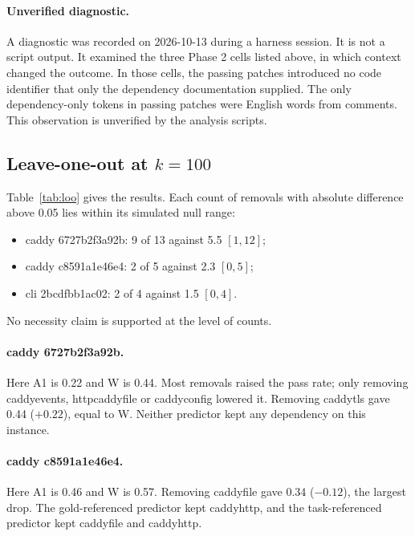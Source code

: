 \paragraph{Unverified diagnostic.} A diagnostic was recorded on 2026-10-13 during a harness session. It is not a script output. It examined the three Phase 2 cells listed above, in which context changed the outcome. In those cells, the passing patches introduced no code identifier that only the dependency documentation supplied. The only dependency-only tokens in passing patches were English words from comments. This observation is unverified by the analysis scripts.

\subsection{Leave-one-out at $k=100$}

Table~\ref{tab:loo} gives the results. Each count of removals with absolute difference above 0.05 lies within its simulated null range:
\begin{itemize}
\item caddy 6727b2f3a92b: 9 of 13 against 5.5 $[1, 12]$;
\item caddy c8591a1e46e4: 2 of 5 against 2.3 $[0, 5]$;
\item cli 2bcdfbb1ac02: 2 of 4 against 1.5 $[0, 4]$.
\end{itemize}
No necessity claim is supported at the level of counts.

\paragraph{caddy 6727b2f3a92b.} Here A1 is 0.22 and W is 0.44. Most removals raised the pass rate; only removing caddyevents, httpcaddyfile or caddyconfig lowered it. Removing caddytls gave 0.44 ($+0.22$), equal to W. Neither predictor kept any dependency on this instance.

\paragraph{caddy c8591a1e46e4.} Here A1 is 0.46 and W is 0.57. Removing caddyfile gave 0.34 ($-0.12$), the largest drop. The gold-referenced predictor kept caddyhttp, and the task-referenced predictor kept caddyfile and caddyhttp.

